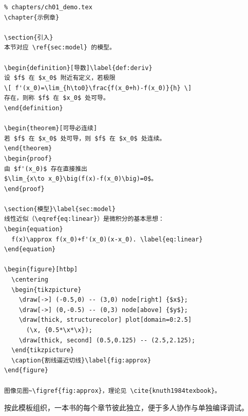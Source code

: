 \begin{lstlisting}
% chapters/ch01_demo.tex
\chapter{示例章}

\section{引入}
本节对应 \ref{sec:model} 的模型。

\begin{definition}[导数]\label{def:deriv}
设 $f$ 在 $x_0$ 附近有定义，若极限
\[ f'(x_0)=\lim_{h\to0}\frac{f(x_0+h)-f(x_0)}{h} \]
存在，则称 $f$ 在 $x_0$ 处可导。
\end{definition}

\begin{theorem}[可导必连续]
若 $f$ 在 $x_0$ 处可导，则 $f$ 在 $x_0$ 处连续。
\end{theorem}
\begin{proof}
由 $f'(x_0)$ 存在直接推出
$\lim_{x\to x_0}\big(f(x)-f(x_0)\big)=0$。
\end{proof}

\section{模型}\label{sec:model}
线性近似（\eqref{eq:linear}）是微积分的基本思想：
\begin{equation}
  f(x)\approx f(x_0)+f'(x_0)(x-x_0). \label{eq:linear}
\end{equation}

\begin{figure}[htbp]
  \centering
  \begin{tikzpicture}
    \draw[->] (-0.5,0) -- (3,0) node[right] {$x$};
    \draw[->] (0,-0.5) -- (0,3) node[above] {$y$};
    \draw[thick, structurecolor] plot[domain=0:2.5]
      (\x, {0.5*\x*\x});
    \draw[thick, second] (0.5,0.125) -- (2.5,2.125);
  \end{tikzpicture}
  \caption{割线逼近切线}\label{fig:approx}
\end{figure}

图像见图~\figref{fig:approx}，理论见 \cite{knuth1984texbook}。
\end{lstlisting}

按此模板组织，一本书的每个章节彼此独立，便于多人协作与单独编译调试。

